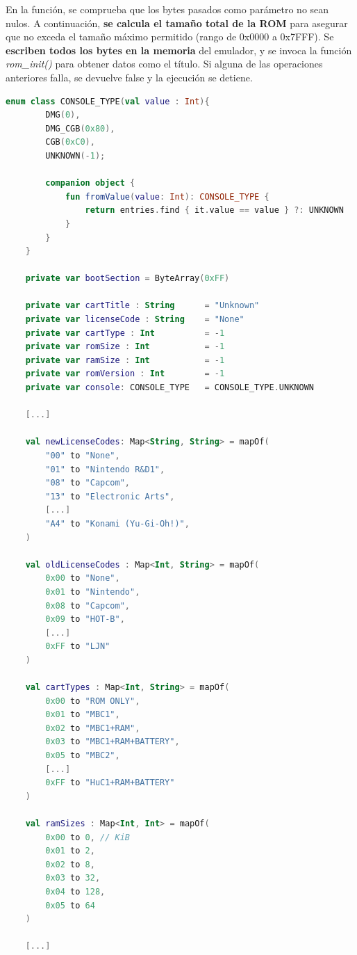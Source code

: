 En la función, se comprueba que los bytes pasados como parámetro no sean nulos. A continuación, \textbf{se calcula el tamaño total de la ROM} para asegurar que no exceda el tamaño máximo permitido (rango de 0x0000 a 0x7FFF). Se \textbf{escriben todos los bytes en la memoria} del emulador, y se invoca la función \textit{rom\_init()} para obtener datos como el título. Si alguna de las operaciones anteriores falla, se devuelve false y la ejecución se detiene.
\clearpage
\begin{lstlisting}[language=Kotlin, caption={Inicialización de la ROM y ejemplos de variables de clase.}, label={code:kotlinloadromread}]
    enum class CONSOLE_TYPE(val value : Int){
        DMG(0),
        DMG_CGB(0x80),
        CGB(0xC0),
        UNKNOWN(-1);

        companion object {
            fun fromValue(value: Int): CONSOLE_TYPE {
                return entries.find { it.value == value } ?: UNKNOWN
            }
        }
    }
    
    private var bootSection = ByteArray(0xFF)

    private var cartTitle : String      = "Unknown"
    private var licenseCode : String    = "None"
    private var cartType : Int          = -1
    private var romSize : Int           = -1
    private var ramSize : Int           = -1
    private var romVersion : Int        = -1
    private var console: CONSOLE_TYPE   = CONSOLE_TYPE.UNKNOWN

    [...]

    val newLicenseCodes: Map<String, String> = mapOf(
        "00" to "None",
        "01" to "Nintendo R&D1",
        "08" to "Capcom",
        "13" to "Electronic Arts",
        [...]
        "A4" to "Konami (Yu-Gi-Oh!)",
    )

    val oldLicenseCodes : Map<Int, String> = mapOf(
        0x00 to "None",
        0x01 to "Nintendo",
        0x08 to "Capcom",
        0x09 to "HOT-B",
        [...]
        0xFF to "LJN"
    )

    val cartTypes : Map<Int, String> = mapOf(
        0x00 to "ROM ONLY",
        0x01 to "MBC1",
        0x02 to "MBC1+RAM",
        0x03 to "MBC1+RAM+BATTERY",
        0x05 to "MBC2",
        [...]
        0xFF to "HuC1+RAM+BATTERY"
    )

    val ramSizes : Map<Int, Int> = mapOf(
        0x00 to 0, // KiB
        0x01 to 2,
        0x02 to 8,
        0x03 to 32,
        0x04 to 128,
        0x05 to 64
    )

    [...]


\end{lstlisting}
